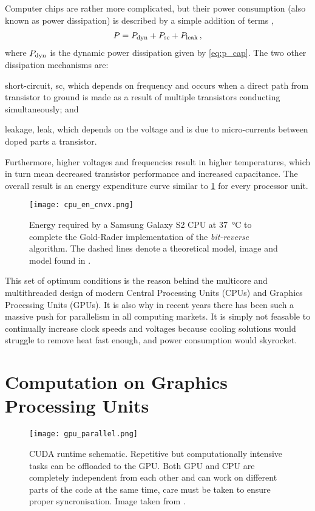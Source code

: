 Computer chips are rather more complicated, but their power consumption (also known as power dissipation) is described by a simple addition of terms \cite{cpu_pow},
\begin{align}
	P = P_{\textrm{dyn}} + P_{\textrm{sc}} + P_{\textrm{leak}}\,,
\end{align}
where $ P_{\textrm{dyn}} $ is the dynamic power dissipation given by \cref{eq:p_cap}. The two other dissipation mechanisms are:
\begin{inparaenum}[\itshape 1\upshape)]
	\item short-circuit, sc, which depends on frequency and occurs when a direct path from transistor to ground is made as a result of multiple transistors conducting simultaneously; and
	\item leakage, leak, which depends on the voltage and is due to micro-currents between doped parts a transistor.
\end{inparaenum}
Furthermore, higher voltages and frequencies result in higher temperatures, which in turn mean decreased transistor performance and increased capacitance. The overall result is an energy expenditure curve similar to \cref{fig:cpu_en_cnvx} \cite{cpu_en_cnvx} for every processor unit.
\begin{figure}[t]
	\centering
	\texttt{[image: cpu\_en\_cnvx.png]}
	\caption[Energy expenditure of CPU vs Voltage.]{Energy required by a Samsung Galaxy S2 CPU at \SI{37}{\degreeCelsius} to complete the Gold-Rader implementation of the \emph{bit-reverse} algorithm. The dashed lines denote a theoretical model, image and model found in \cite{cpu_en_cnvx}.}
	\label{fig:cpu_en_cnvx}
\end{figure}

This set of optimum conditions is the reason behind the multicore and multithreaded design of modern Central Processing Units (CPUs) and Graphics Processing Units (GPUs). It is also why in recent years there has been such a massive push for parallelism in all computing markets. It is simply not feasable to continually increase clock speeds and voltages because cooling solutions would struggle to remove heat fast enough, and power consumption would skyrocket.

\section{Computation on Graphics Processing Units}
\begin{figure}[t]
	\centering
	\texttt{[image: gpu\_parallel.png]}
	\caption[CUDA runtime schematic.]{CUDA runtime schematic. Repetitive but computationally intensive tasks can be offloaded to the GPU. Both GPU and CPU are completely independent from each other and can work on different parts of the code at the same time, care must be taken to ensure proper syncronisation. Image taken from \cite{nvidia}.}
	\label{fig:cuda}
\end{figure}

